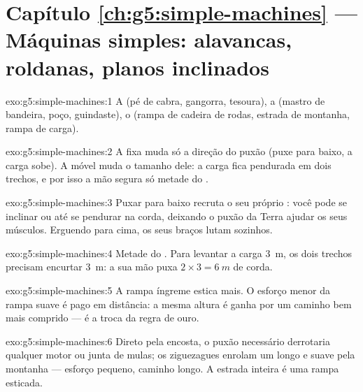 \section*{Capítulo \ref{ch:g5:simple-machines} --- Máquinas simples: alavancas, roldanas, planos inclinados}

\begin{solution}{exo:g5:simple-machines:1}
A  (pé de cabra, gangorra, tesoura), a  (mastro de
bandeira, poço, guindaste), o  (rampa de cadeira de
rodas, estrada de montanha, rampa de carga).
\end{solution}

\begin{solution}{exo:g5:simple-machines:2}
A  fixa muda só a direção do puxão (puxe para baixo, a carga
sobe). A  móvel muda o tamanho dele: a carga fica pendurada em
dois trechos, e por isso a mão segura só metade do .
\end{solution}

\begin{solution}{exo:g5:simple-machines:3}
Puxar para baixo recruta o seu próprio : você pode se inclinar ou
até se pendurar na corda, deixando o puxão da Terra ajudar os seus
músculos. Erguendo para cima, os seus braços lutam sozinhos.
\end{solution}

\begin{solution}{exo:g5:simple-machines:4}
Metade do . Para levantar a carga \qty{3}{m}, os dois trechos
precisam encurtar \qty{3}{m}: a sua mão puxa
$2 \times 3 = \qty{6}{m}$ de corda.
\end{solution}

\begin{solution}{exo:g5:simple-machines:5}
A rampa íngreme estica mais. O esforço menor da rampa suave é pago em
distância: a mesma altura é ganha por um caminho bem mais comprido
--- é a troca da regra de ouro.
\end{solution}

\begin{solution}{exo:g5:simple-machines:6}
Direto pela encosta, o puxão necessário derrotaria qualquer motor ou
junta de mulas; os ziguezagues enrolam um  longo e
suave pela montanha --- esforço pequeno, caminho longo. A estrada
inteira é uma rampa esticada.
\end{solution}

